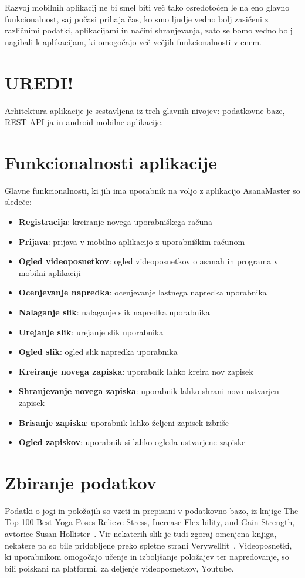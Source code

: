 \documentclass[a4paper, 12pt]{book}
\begin{document}
Razvoj mobilnih aplikacij ne bi smel biti več tako osredotočen le na eno glavno funkcionalnost, saj počasi prihaja čas, ko smo ljudje vedno bolj zasičeni z različnimi podatki, aplikacijami in načini shranjevanja, zato se bomo vedno bolj nagibali k aplikacijam, ki omogočajo več večjih funkcionalnosti v enem.

\section{UREDI!}
Arhitektura aplikacije je sestavljena iz treh glavnih nivojev: podatkovne baze, REST API-ja in android mobilne aplikacije.

\section{Funkcionalnosti aplikacije}
Glavne funkcionalnosti, ki jih ima uporabnik na voljo z aplikacijo AsanaMaster so sledeče:

 \begin{itemize}
  \item \textbf{Registracija}: kreiranje novega uporabniškega računa
  \item \textbf{Prijava}: prijava v mobilno aplikacijo z uporabniškim računom
  \item \textbf{Ogled videoposnetkov}: ogled videoposnetkov o asanah in programa v mobilni aplikaciji
  \item \textbf{Ocenjevanje napredka}: ocenjevanje lastnega napredka uporabnika
  \item \textbf{Nalaganje slik}: nalaganje slik napredka uporabnika
  \item \textbf{Urejanje slik}: urejanje slik uporabnika
  \item \textbf{Ogled slik}: ogled slik napredka uporabnika
  \item \textbf{Kreiranje novega zapiska}: uporabnik lahko kreira nov zapisek
  \item \textbf{Shranjevanje novega zapiska}: uporabnik lahko shrani novo ustvarjen zapisek
  \item \textbf{Brisanje zapiska}: uporabnik lahko željeni zapisek izbriše
  \item \textbf{Ogled zapiskov}: uporabnik si lahko ogleda ustvarjene zapiske
\end{itemize}

\section{Zbiranje podatkov}
 Podatki o jogi in položajih so vzeti in prepisani v podatkovno bazo, iz knjige The Top 100 Best Yoga Poses Relieve Stress, Increase Flexibility, and Gain Strength, avtorice Susan Hollister~\cite{yoga}. Vir nekaterih slik je tudi zgoraj omenjena knjiga, nekatere pa so bile pridobljene preko spletne strani Verywellfit~\cite{verywellfit}. Videoposnetki, ki uporabnikom omogočajo učenje in izboljšanje položajev ter napredovanje, so bili poiskani na platformi, za deljenje videoposnetkov, Youtube.
\end{document}

